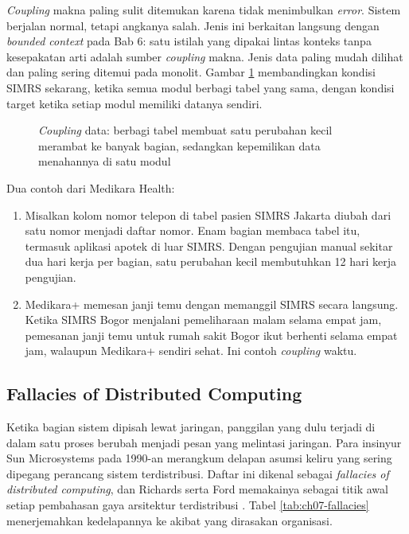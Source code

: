 \textit{Coupling} makna paling sulit ditemukan karena tidak menimbulkan \textit{error}. Sistem
berjalan normal, tetapi angkanya salah. Jenis ini berkaitan langsung dengan \textit{bounded
context} pada Bab 6: satu istilah yang dipakai lintas konteks tanpa kesepakatan arti adalah sumber
\textit{coupling} makna. Jenis data paling mudah dilihat dan paling sering ditemui pada monolit.
Gambar \ref{fig:ch07-coupling-data} membandingkan kondisi SIMRS sekarang, ketika semua modul berbagi
tabel yang sama, dengan kondisi target ketika setiap modul memiliki datanya sendiri.

\begin{figure}[!htb]
  \centering
  
  \caption{\textit{Coupling} data: berbagi tabel membuat satu perubahan kecil
           merambat ke banyak bagian, sedangkan kepemilikan data menahannya di
           satu modul}
  \label{fig:ch07-coupling-data}
\end{figure}

Dua contoh dari Medikara Health:
\begin{enumerate}
  \item Misalkan kolom nomor telepon di tabel pasien SIMRS Jakarta diubah dari satu nomor menjadi
        daftar nomor. Enam bagian membaca tabel itu, termasuk aplikasi apotek di luar SIMRS.
        Dengan pengujian manual sekitar dua hari kerja per bagian, satu perubahan kecil
        membutuhkan 12 hari kerja pengujian.
  \item Medikara+ memesan janji temu dengan memanggil SIMRS secara langsung. Ketika SIMRS Bogor
        menjalani pemeliharaan malam selama empat jam, pemesanan janji temu untuk rumah sakit
        Bogor ikut berhenti selama empat jam, walaupun Medikara+ sendiri sehat. Ini contoh
        \textit{coupling} waktu.
\end{enumerate}

\subsection{Fallacies of Distributed Computing}

Ketika bagian sistem dipisah lewat jaringan, panggilan yang dulu terjadi di dalam satu proses
berubah menjadi pesan yang melintasi jaringan. Para insinyur Sun Microsystems pada 1990-an merangkum
delapan asumsi keliru yang sering dipegang perancang sistem terdistribusi. Daftar ini dikenal
sebagai \textit{fallacies of distributed computing}, dan Richards serta Ford memakainya sebagai
titik awal setiap pembahasan gaya arsitektur terdistribusi \cite{richards2025}. Tabel
\ref{tab:ch07-fallacies} menerjemahkan kedelapannya ke akibat yang dirasakan organisasi.

